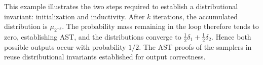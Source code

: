 This example illustrates the two steps required to establish
a distributional invariant: initialization and inductivity.
After $k$ iterations, the accumulated distribution is
$\mu_{2^{-k}}$.
The probability mass remaining in the loop therefore tends
to zero, establishing AST, and the distributions converge to
$\frac12\delta_1+\frac12\delta_2$.
Hence both possible outputs occur with probability $1/2$.
The AST proofs of the samplers in  reuse distributional
invariants established for output correctness.
